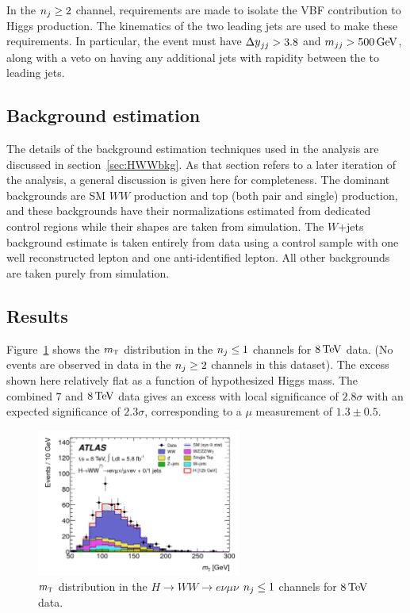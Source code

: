 In the $n_j \geq 2$ channel, requirements are made to isolate the VBF contribution to Higgs production. The kinematics of the two leading jets are used to make these requirements. In particular, the event must have $\dyjj > 3.8$ and $\mjj > 500 \GeV$, along with a veto on having any additional jets with rapidity between the to leading jets. 

\subsection{Background estimation}

The details of the background estimation techniques used in the \HWWfull analysis are discussed in section~\ref{sec:HWWbkg}. As that section refers to a later iteration of the analysis, a general discussion is given here for completeness. The dominant backgrounds are SM $WW$ production and top (both pair and single) production, and these backgrounds have their normalizations estimated from dedicated control regions while their shapes are taken from simulation. The $W$+jets background estimate is taken entirely from data using a control sample with one well reconstructed lepton and one anti-identified lepton. All other backgrounds are taken purely from simulation. 

\subsection{Results}

Figure~\ref{fig:disc_mt} shows the $m_{\textrm{\footnotesize\sc t}}$ distribution in the $n_j \leq 1$ channels for $8 \TeV$ data. (No events are observed in data in the $n_j \geq 2$ channels in this dataset). The excess shown here relatively flat as a function of hypothesized Higgs mass. The combined $7$ and $8\TeV$ data gives an excess with local significance of $2.8\sigma$ with an expected significance of $2.3\sigma$, corresponding to a $\mu$ measurement of $1.3\pm 0.5$. 

\begin{figure}[h!]
  \centering
  \captionsetup{justification=centering}
  \includegraphics[width=0.6\textwidth]{figures/discovery_mt}
  \caption{$m_{\textrm{\footnotesize\sc t}}$ distribution in the $H\to WW \to e\nu\mu\nu$ $n_j \leq 1$ channels for $8 \TeV$ data\cite{Discovery}.}
  \label{fig:disc_mt}
\end{figure}

